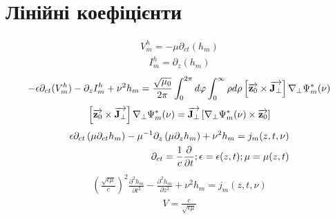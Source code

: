 \section{Лінійні коефіцієнти}

\begin{equation} \begin{aligned}
V_m^h  = - \mu \partial_{ct} (h_m)
\end{aligned} \end{equation}
%
\begin{equation} \begin{aligned}
I_m^h  = \partial_z (h_m)
\end{aligned} \end{equation}
%
\textcolor{lightgray} { \begin{equation*} \begin{aligned}
- \epsilon \partial_{ct} (V_m^h) - \partial_z I_m^h + \nu^2 h_m = 
\frac{\sqrt{\mu_0}}{2 \pi} \int_0^{2\pi} d \varphi 
\int_0^{\infty} \rho d \rho \left[ \overrightarrow{\mathbf z_0} \times \overrightarrow{\mathbf J_\perp} \right]
\nabla_\perp \Psi_m^* (\nu) 
\end{aligned} \end{equation*} }
%
\textcolor{red} { \begin{equation*} \begin{aligned}
\left[ \overrightarrow{\mathbf z_0} \times \overrightarrow{\mathbf J_\perp} \right] \nabla_\perp \Psi_m^* (\nu) =
\overrightarrow{\mathbf J_\perp} \left[ \nabla_\perp \Psi_m^* (\nu) \times \overrightarrow{\mathbf z_0} \right]
\end{aligned} \end{equation*} }
%
\begin{equation*} \begin{aligned}
\epsilon \partial_{ct} \left( \mu \partial_{ct} h_m \right) -
\mu^{-1} \partial_z \left( \mu  \partial_z h_m \right) + 
\nu^2 h_m = j_m (z,t,\nu) \\
\partial_{ct} =  \frac{1}{c} \frac{\partial }{\partial t}; 
\epsilon = \epsilon (z,t);
\mu = \mu (z,t)
\end{aligned} \end{equation*}
%
\begin{equation} \begin{aligned}
\left( \frac{\sqrt{\epsilon \mu}}{c} \right)^2 
\frac{\partial^2 h_m}{\partial t^2} - 
\frac{\partial^2 h_m}{\partial z^2} + \nu^2 h_m = j_m (z,t,\nu)
\end{aligned} \end{equation}
%
\begin{equation} \begin{aligned}
\mathit{V} = \frac{c}{\sqrt{\epsilon \mu}} 
\end{aligned} \end{equation}

